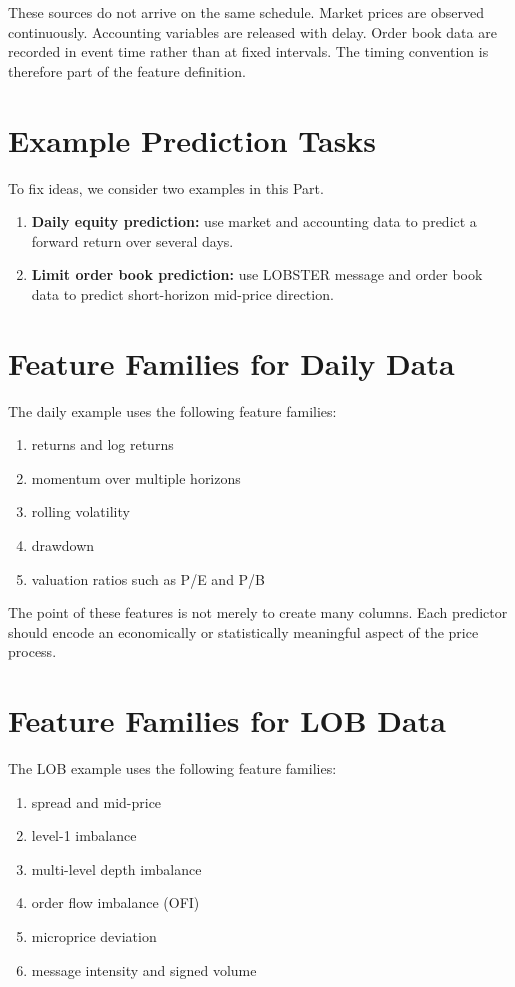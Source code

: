 \documentclass[11pt]{article}
\begin{document}
These sources do not arrive on the same schedule. Market prices are observed
continuously. Accounting variables are released with delay. Order book data are
recorded in event time rather than at fixed intervals. The timing convention is
therefore part of the feature definition.

\section*{Example Prediction Tasks}

To fix ideas, we consider two examples in this Part.

\begin{enumerate}
  \item \textbf{Daily equity prediction:} use market and accounting data to predict a forward return over several days.
  \item \textbf{Limit order book prediction:} use LOBSTER message and order book data to predict short-horizon mid-price direction.
\end{enumerate}

\section*{Feature Families for Daily Data}

The daily example uses the following feature families:

\begin{enumerate}
  \item returns and log returns
  \item momentum over multiple horizons
  \item rolling volatility
  \item drawdown
  \item valuation ratios such as P/E and P/B
\end{enumerate}

The point of these features is not merely to create many columns. Each
predictor should encode an economically or statistically meaningful aspect of
the price process.

\section*{Feature Families for LOB Data}

The LOB example uses the following feature families:

\begin{enumerate}
  \item spread and mid-price
  \item level-1 imbalance
  \item multi-level depth imbalance
  \item order flow imbalance (OFI)
  \item microprice deviation
  \item message intensity and signed volume
\end{enumerate}
\end{document}
